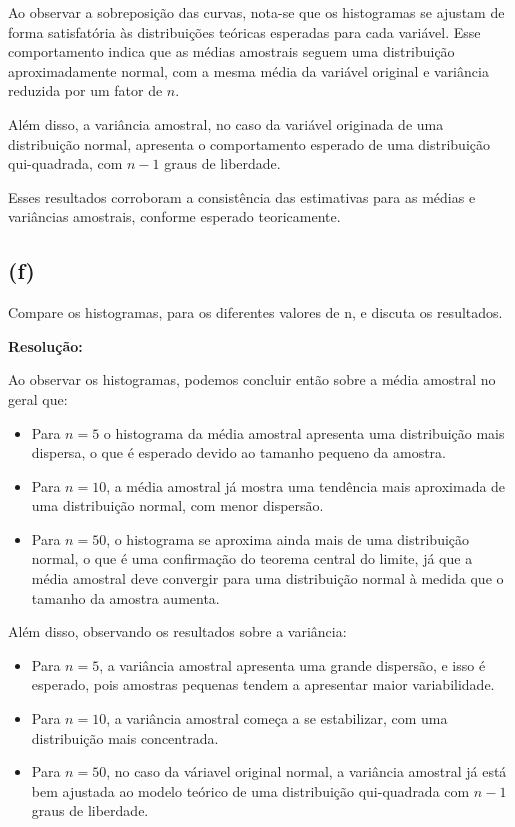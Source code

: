 \documentclass[a4paper, 11pt]{article}
\begin{document}
Ao observar a sobreposição das curvas, nota-se que os histogramas se ajustam de forma satisfatória às distribuições teóricas esperadas para cada variável. 
Esse comportamento indica que as médias amostrais seguem uma distribuição aproximadamente normal, com a mesma média da variável original e variância reduzida por um fator de \( n \).

Além disso, a variância amostral, no caso da variável originada de uma distribuição normal, apresenta o comportamento esperado de uma distribuição qui-quadrada, com \( n - 1 \) graus de liberdade.

Esses resultados corroboram a consistência das estimativas para as médias e variâncias amostrais, conforme esperado teoricamente.

\subsection{\textbf{(f)}}

\noindent Compare os histogramas, para os diferentes valores de n, e discuta os resultados.

\textbf{Resolução:}

Ao observar os histogramas, podemos concluir então sobre a média amostral no geral que:

\begin{itemize}
    \item Para \(n = 5\) o histograma da média amostral apresenta uma distribuição mais dispersa, o que é esperado devido ao tamanho pequeno da amostra.
    \item Para \(n = 10\), a média amostral já mostra uma tendência mais aproximada de uma distribuição normal, com menor dispersão.
    \item Para \(n = 50\), o histograma se aproxima ainda mais de uma distribuição normal, o que é uma confirmação do teorema central do limite, já que a média amostral deve convergir para uma distribuição normal à medida que o tamanho da amostra aumenta.
\end{itemize}

Além disso, observando os resultados sobre a variância:

\begin{itemize}
    \item Para \(n = 5\), a variância amostral apresenta uma grande dispersão, e isso é esperado, pois amostras pequenas tendem a apresentar maior variabilidade.
    \item Para \(n = 10\), a variância amostral começa a se estabilizar, com uma distribuição mais concentrada.
    \item Para \(n = 50\), no caso da váriavel original normal, a variância amostral já está bem ajustada ao modelo teórico de uma distribuição qui-quadrada com \(n -1\) graus de liberdade.
\end{itemize}
\end{document}
